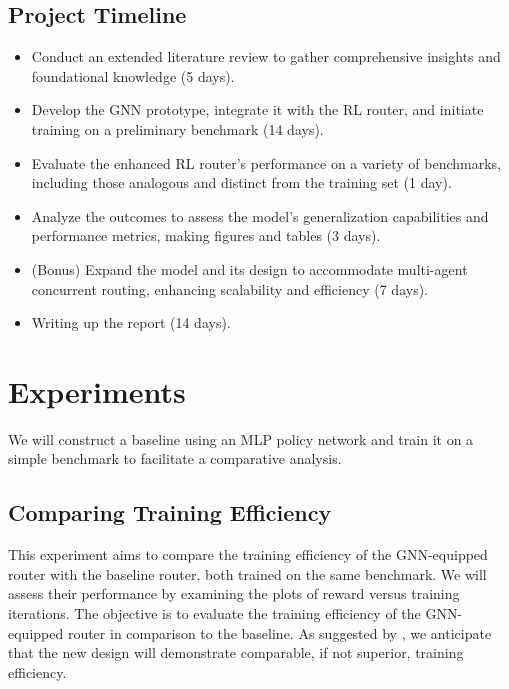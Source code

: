 \documentclass[letterpaper]{article}
\begin{document}

\subsection{Project Timeline}
\begin{itemize}
    \item Conduct an extended literature review to gather comprehensive insights and foundational knowledge (5 days).
    \item Develop the GNN prototype, integrate it with the RL router, and initiate training on a preliminary benchmark (14 days).
    \item Evaluate the enhanced RL router’s performance on a variety of benchmarks, including those analogous and distinct from the training set (1 day).
    \item Analyze the outcomes to assess the model's generalization capabilities and performance metrics, making figures and tables (3 days).
    \item (Bonus) Expand the model and its design to accommodate multi-agent concurrent routing, enhancing scalability and efficiency (7 days).
    \item Writing up the report (14 days).
\end{itemize}

    
\section{Experiments}
We will construct a baseline using an MLP policy network and train it on a simple benchmark to facilitate a comparative analysis.

\subsection{Comparing Training Efficiency}
This experiment aims to compare the training efficiency of the GNN-equipped router with the baseline router, both trained on the same benchmark. We will assess their performance by examining the plots of reward versus training iterations. The objective is to evaluate the training efficiency of the GNN-equipped router in comparison to the baseline. As suggested by \cite{Wang2018}, we anticipate that the new design will demonstrate comparable, if not superior, training efficiency.
\end{document}
